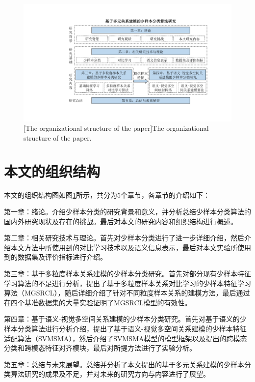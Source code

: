 \begin{figure}[h]
    \centering
    \includegraphics[width=1.0\columnwidth]{figures/组织结构.pdf}
    [The organizational structure of the paper]{The organizational structure of the paper.}
    \label{figure1: 组织结构}
\end{figure}

\section[\hspace{-2pt}本文组织结构]{{\heiti{} \hspace{-8pt}本文的组织结构}}\label{section1: 本文组织结构}

本文的组织结构图如图\ref{figure1: 组织结构}所示，共分为5个章节，各章节的介绍如下：

第一章：绪论。介绍少样本分类的研究背景和意义，并分析总结少样本分类算法的国内外研究现状及存在的挑战。最后对本文的研究内容和组织结构进行概述。

第二章：相关研究技术与理论。首先对少样本分类进行了进一步详细介绍，然后介绍本文方法中所使用到的对比学习技术以及语义信息表示，最后对本文实验所使用到的数据集及评价指标进行介绍。

第三章：基于多粒度样本关系建模的少样本分类研究。首先对部分现有少样本特征学习算法的不足进行分析，提出了基于多粒度样本关系对比学习的少样本特征学习算法（MGSRCL），随后详细介绍了针对不同粒度样本关系的建模方法，最后通过在四个基准数据集的大量实验证明了MGSRCL模型的有效性。

第四章：基于语义-视觉多空间关系建模的少样本分类研究。首先对基于语义的少样本分类算法进行分析介绍，提出了基于语义-视觉多空间关系建模的少样本特征适配算法（SVMSMA），然后介绍了SVMSMA模型的模型框架以及提出的跨模态分类和跨模态特征对齐模块，最后对所提方法进行了实验分析。

第五章：总结与未来展望。总结并分析了本文提出的基于多元关系建模的少样本分类算法研究的成果及不足，并对未来的研究方向与内容进行了展望。

